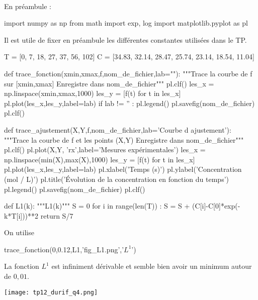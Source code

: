 \exer{[SATIO-004]}
\setcounter{numques}{0}~\\

En préambule : 
\begin{pyverbatim}
import numpy as np
from math import exp, log
import matplotlib.pyplot as pl
\end{pyverbatim}

Il est utile de fixer en préambule les différentes constantes utilisées dans le TP.
\begin{pyverbatim}
T = [0, 7, 18, 27, 37, 56, 102]
C = [34.83, 32.14, 28.47, 25.74, 23.14, 18.54, 11.04]
\end{pyverbatim}

\question{}
\begin{pyverbatim}
def trace_fonction(xmin,xmax,f,nom_de_fichier,lab=""):
    """Trace la courbe de f sur [xmin,xmax]
    Enregistre dans nom_de_fichier"""
    pl.clf()
    les_x = np.linspace(xmin,xmax,1000)
    les_y = [f(t) for t in les_x]
    pl.plot(les_x,les_y,label=lab)
    if lab != '' :
        pl.legend()
    pl.savefig(nom_de_fichier)
    pl.clf()
\end{pyverbatim}



\question{}
\begin{pyverbatim}
def trace_ajustement(X,Y,f,nom_de_fichier,lab='Courbe d ajustement'):
    """Trace la courbe de f et les points (X,Y)
    Enregistre dans nom_de_fichier"""
    pl.clf()
    pl.plot(X,Y, 'rx',label='Mesures expérimentales')
    les_x = np.linspace(min(X),max(X),1000)
    les_y = [f(t) for t in les_x]
    pl.plot(les_x,les_y,label=lab)
    pl.xlabel('Temps (s)')
    pl.ylabel('Concentration (mol / L)')
    pl.title('Évolution de la concentration en fonction du temps')
    pl.legend()
    pl.savefig(nom_de_fichier)
    pl.clf()
\end{pyverbatim}

\question{}
\begin{pyverbatim}
def L1(k):
    """L1(k)"""
    S = 0
    for i in range(len(T)) :
        S = S + (C[i]-C[0]*exp(-k*T[i]))**2
    return S/7
\end{pyverbatim}

\question{}
On utilise
\begin{pyverbatim}
trace_fonction(0,0.12,L1,'fig_L1.png','$L^1$')
\end{pyverbatim}
La fonction $L^1$ est infiniment dérivable et semble bien avoir un minimum autour de $0,01$.

\begin{center}
\texttt{[image: tp12\_durif\_q4.png]}
\end{center}


